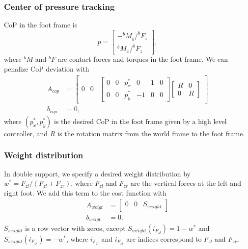 \documentclass{ws-ijhr}
\begin{document}
\subsubsection{Center of pressure tracking} 
CoP in the foot frame is
\begin{equation}
  p = \begin{bmatrix} -^{b}M_{y} / ^{b}F_{z} \\ ^{b}M_{x} / ^{b}F_{z} \end{bmatrix},
\end{equation}
where $^{b}M$ and $^{b}F$ are contact forces and torques in the foot frame.
We can penalize CoP deviation with
\begin{equation}
  \begin{split}
    A_{cop} &= \begin{bmatrix} 0 & 0 & \begin{bmatrix} 0 & 0 & p_x^* & 0 & 1 & 0 \\ 0 & 0 & p_y^* & -1 & 0 & 0 \end{bmatrix} \begin{bmatrix} R & 0 \\ 0 & R \end{bmatrix} \end{bmatrix} \\
    b_{cop} &= 0,
  \end{split}
\end{equation}
where $(p_x^*, p_y^*)$ is the desired CoP in the foot frame given by
a high level controller, and $R$ is the rotation matrix from the world frame to
the foot frame.

\subsubsection{Weight distribution} 
In double support, we specify a desired weight distribution by  
$w^* = F_{zl} / (F_{zl}+F_{zr})$, where $F_{zl}$ and $F_{zr}$ are the vertical 
forces at the left and right foot. We add this term to the cost function with
\begin{equation}
  \begin{split}
    A_{weigt} &= \begin{bmatrix} 0 & 0 & S_{weight} \end{bmatrix} \\
    b_{weigt} &= 0.
  \end{split}
\end{equation}
$S_{weight}$ is a row vector with zeros, except $S_{weight}(i_{F_{zl}}) = 1-w^*$ and 
$S_{weight}(i_{F_{zr}}) = -w^*$, where $i_{F_{zl}}$ and $i_{F_{zr}}$ are indices correspond
to $F_{zl}$ and $F_{zr}$.
\end{document}

